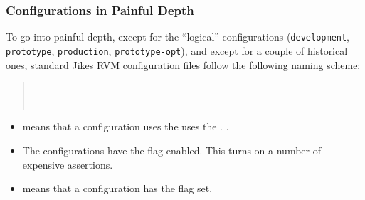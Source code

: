 \subsubsection{Configurations in Painful Depth}
To go into painful depth, except for the ``logical'' configurations
(\texttt{development}, 
\texttt{prototype}, \texttt{production}, \texttt{prototype-opt}), and
except for a couple of historical ones, standard Jikes\TMweb{} RVM configuration
files follow the following naming scheme:
\begin{verse}
        \\
  \Mlbr{}  \Mor{}
  \Mrbr{} \\
         
\end{verse}

\begin{itemize}
\item {} means that a configuration uses the
        uses the .  
        .  

\item The  configurations have the
           flag
          enabled.  This turns on a number of expensive assertions.

\item {} means that a configuration has the
           flag set.


\end{itemize}

